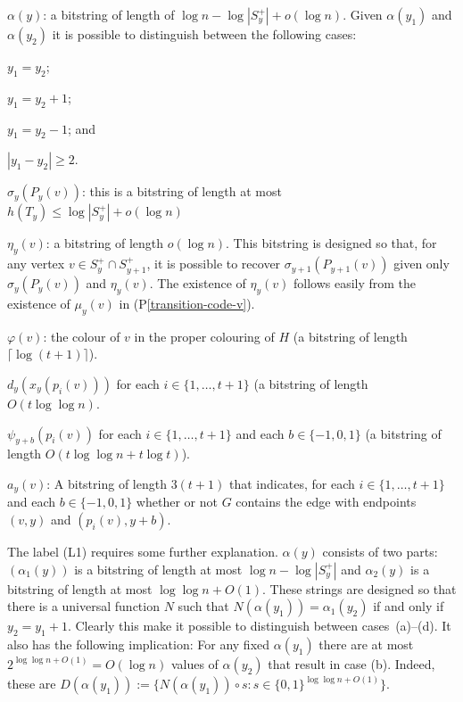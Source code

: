 \documentclass{patmorin}
\newcommand{\pref}[1]{(P\ref{#1})}
\begin{document}
\begin{compactenum}[(L1)]
    \item $\alpha(y)$: a bitstring of length of $\log n-\log |S^+_y|+o(\log n)$.  Given $\alpha(y_1)$ and $\alpha(y_2)$ it is possible to distinguish between the following cases:
    \begin{inparaenum}
        \item $y_1=y_2$;
        \item $y_1=y_2+1$;
        \item $y_1=y_2-1$; and
        \item $|y_1-y_2|\ge 2$.
    \end{inparaenum}

    \item $\sigma_y(P_y(v))$: this is a bitstring of length at most $h(T_y)\le \log|S^+_y| + o(\log n)$

    \item $\eta_y(v)$: a bitstring of length $o(\log n)$.  This bitstring is designed so that, for any vertex $v\in S^+_y\cap S^+_{y+1}$, it is possible to recover $\sigma_{y+1}(P_{y+1}(v))$ given only $\sigma_y(P_y(v))$ and $\eta_y(v)$.  The existence of $\eta_y(v)$ follows easily from the existence of $\mu_y(v)$ in \pref{transition-code-v}.

    \item $\varphi(v)$: the colour of $v$ in the proper colouring of $H$ (a bitstring of length $\lceil\log(t+1)\rceil$).

    \item $d_y(x_y(p_i(v)))$ for each $i\in\{1,\ldots,t+1\}$ (a bitstring of length $O(t\log\log n)$.

    \item $\psi_{y+b}(p_i(v))$ for each $i\in\{1,\ldots,t+1\}$ and each $b\in\{-1,0,1\}$ (a bitstring of length $O(t\log\log n + t\log t)$).\label{psi}

    \item $a_y(v)$: A bitstring of length $3(t+1)$ that indicates, for each $i\in\{1,\ldots,t+1\}$ and each $b\in\{-1,0,1\}$ whether or not $G$ contains the edge with endpoints $(v,y)$ and $(p_i(v),y+b)$.
\end{compactenum}

The label (L1) requires some further explanation. $\alpha(y)$ consists of two parts: $(\alpha_1(y))$ is a bitstring of length at most $\log n-\log |S^+_y|$ and $\alpha_2(y)$ is a bitstring of length at most $\log\log n+O(1)$.  These strings are designed so that there is a universal function $N$ such that $N(\alpha(y_1))=\alpha_1(y_2)$ if and only if $y_2=y_1+1$.  Clearly this make it possible to distinguish between cases~(a)--(d).  It also has the following implication:  For any fixed $\alpha(y_1)$ there are at most $2^{\log \log n+O(1)}=O(\log n)$ values of $\alpha(y_2)$ that result in case (b).  Indeed, these are $D(\alpha(y_1)):=\{N(\alpha(y_1))\mathbin{\circ} s: s\in\{0,1\}^{\log\log n+O(1)}\}$.
\end{document}

